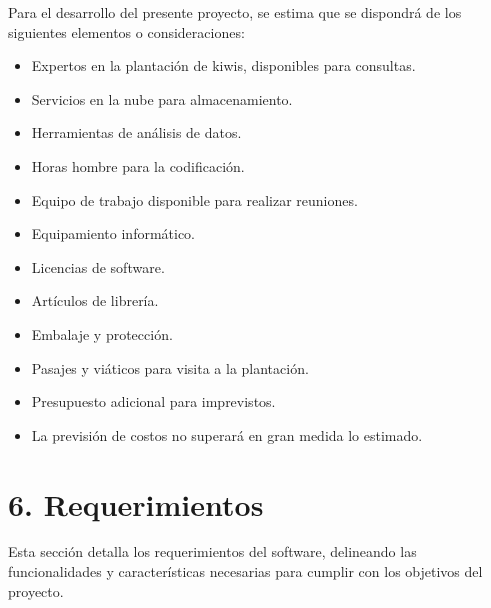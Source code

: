 \documentclass[
11pt, %
]{charter}
\begin{document}
Para el desarrollo del presente proyecto, se estima que se dispondrá de los siguientes elementos o consideraciones:

\begin{itemize}
    \item Expertos en la plantación de kiwis, disponibles para consultas.
    \item Servicios en la nube para almacenamiento.
    \item Herramientas de análisis de datos.
    \item Horas hombre para la codificación.
    \item Equipo de trabajo disponible para realizar reuniones.
    \item Equipamiento informático.
    \item Licencias de software.
    \item Artículos de librería.
    \item Embalaje y protección.
    \item Pasajes y viáticos para visita a la plantación.
    \item Presupuesto adicional para imprevistos.
    \item La previsión de costos no superará en gran medida lo estimado.
\end{itemize}


\section{6. Requerimientos}
\label{sec:requerimientos}
Esta sección detalla los requerimientos del software, delineando las funcionalidades y características necesarias para cumplir con los objetivos del proyecto.
\end{document}

